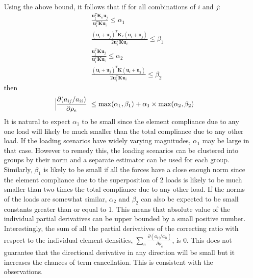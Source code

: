 Using the above bound, it follows that if for all combinations of $i$ and $j$:
\begin{align}
  \frac{\bm{u}_j^T \bm{K}_e \bm{u}_j}{\bm{u}_i^T \bm{K} \bm{u}_i} \leq \alpha_1 \\
  \frac{(\bm{u}_i + \bm{u}_j)^T \bm{K}_e (\bm{u}_i + \bm{u}_j)}{2 \bm{u}_i^T \bm{K} \bm{u}_i} \leq \beta_1 \\
  \frac{\bm{u}_j^T \bm{K} \bm{u}_j}{\bm{u}_i^T \bm{K} \bm{u}_i} \leq \alpha_2\\
  \frac{(\bm{u}_i + \bm{u}_j)^T \bm{K} (\bm{u}_i + \bm{u}_j)}{2 \bm{u}_i^T \bm{K} \bm{u}_i} \leq \beta_2
\end{align}
then
\begin{align}
  \Bigl|\frac{\partial (a_{ij} / a_{ii})}{\partial \rho_e}\Bigr| & \leq \max(\alpha_1, \beta_1) + \alpha_1 \times \max(\alpha_2, \beta_2)
\end{align}
It is natural to expect $\alpha_1$ to be small since the element compliance due to any one load will likely be much smaller than the total compliance due to any other load. If the loading scenarios have widely varying magnitudes, $\alpha_1$ may be large in that case. However to remedy this, the loading scenarios can be clustered into groups by their norm and a separate estimator can be used for each group. Similarly, $\beta_1$ is likely to be small if all the forces have a close enough norm since the element compliance due to the superposition of 2 loads is likely to be much smaller than two times the total compliance due to any other load. If the norms of the loads are somewhat similar, $\alpha_2$ and $\beta_2$ can also be expected to be small constants greater than or equal to 1. This means that absolute value of the individual partial derivatives can be upper bounded by a small positive number. Interestingly, the sum of all the partial derivatives of the correcting ratio with respect to the individual element densities, $\sum_e \frac{\partial (a_{ij} / a_{ii})}{\partial \rho_e}$, is 0. This does not guarantee that the directional derivative in any direction will be small but it increases the chances of term cancellation. This is consistent with the observations.

